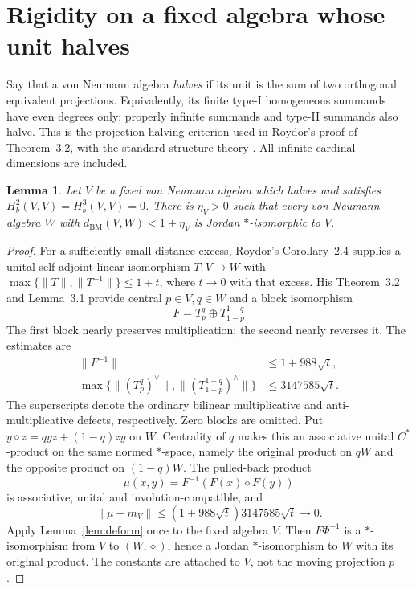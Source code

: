 \documentclass[11pt]{article}
\newtheorem{lemma}[theorem]{Lemma}
\newcommand{\BM}{d_{\mathrm{BM}}}
\newcommand{\Hb}{H_b}
\begin{document}
\section{Rigidity on a fixed algebra whose unit halves}
Say that a von Neumann algebra \emph{halves} if its unit is the sum of two
orthogonal equivalent projections. Equivalently, its finite type-I
homogeneous summands have even degrees only; properly infinite summands
and type-II summands also halve. This is the projection-halving criterion
used in Roydor's proof of Theorem~3.2, with the standard structure theory
\cite{KR,Takesaki}. All infinite cardinal dimensions are included.

\begin{lemma}\label{lem:halve}
Let $V$ be a fixed von Neumann algebra which halves and satisfies
$\Hb^2(V,V)=\Hb^3(V,V)=0$. There is $\eta_V>0$ such that every von
Neumann algebra $W$ with $\BM(V,W)<1+\eta_V$ is Jordan $*$-isomorphic
to $V$.
\end{lemma}
\begin{proof}
For a sufficiently small distance excess, Roydor's Corollary~2.4 supplies
a unital self-adjoint linear isomorphism $T:V\to W$ with
$\max\{\|T\|,\|T^{-1}\|\}\le1+t$, where $t\to0$ with that excess.
His Theorem~3.2 and Lemma~3.1 provide central $p\in V,q\in W$ and a
block isomorphism
\[
 F=T_p^q\oplus T_{1-p}^{1-q}
\]
The first block nearly preserves multiplication; the second nearly
reverses it. The estimates are
\begin{align*}
 \|F^{-1}\|&\le1+988\sqrt t,\\
 \max\{\|(T_p^q)^\vee\|,\|(T_{1-p}^{1-q})^\wedge\|\}
 &\le3147585\sqrt t.
\end{align*}
The superscripts denote the ordinary bilinear multiplicative and
anti-multiplicative defects, respectively. Zero blocks are omitted.
Put $y\diamond z=qyz+(1-q)zy$ on $W$. Centrality of $q$ makes this
an associative unital $C^*$-product on the same normed $*$-space, namely
the original product on $qW$ and the opposite product on $(1-q)W$.
The pulled-back product
\[
 \mu(x,y)=F^{-1}(F(x)\diamond F(y))
\]
is associative, unital and involution-compatible, and
\[
 \|\mu-m_V\|\le(1+988\sqrt t)3147585\sqrt t\longrightarrow0.
\]
Apply Lemma~\ref{lem:deform} once to the fixed algebra $V$.
Then $F\Phi^{-1}$ is a $*$-isomorphism from $V$ to $(W,\diamond)$,
hence a Jordan $*$-isomorphism to $W$ with its original product.
The constants are attached to $V$, not the moving projection $p$.
\end{proof}
\end{document}
